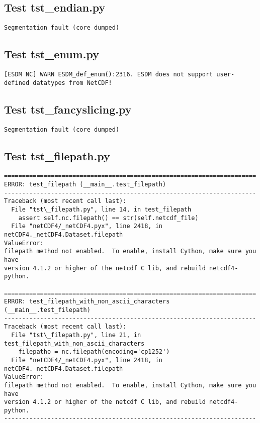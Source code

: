 \subsection{Test tst\_endian.py}

\begin{verbatim}
Segmentation fault (core dumped)
\end{verbatim}

\subsection{Test tst\_enum.py}

\begin{verbatim}
[ESDM NC] WARN ESDM_def_enum():2316. ESDM does not support user-defined datatypes from NetCDF!
\end{verbatim}

\subsection{Test tst\_fancyslicing.py}

\begin{verbatim}
Segmentation fault (core dumped)
\end{verbatim}

\subsection{Test tst\_filepath.py}

\begin{verbatim}
======================================================================
ERROR: test_filepath (__main__.test_filepath)
----------------------------------------------------------------------
Traceback (most recent call last):
  File "tst\_filepath.py", line 14, in test_filepath
    assert self.nc.filepath() == str(self.netcdf_file)
  File "netCDF4/_netCDF4.pyx", line 2418, in netCDF4._netCDF4.Dataset.filepath
ValueError:
filepath method not enabled.  To enable, install Cython, make sure you have
version 4.1.2 or higher of the netcdf C lib, and rebuild netcdf4-python.

======================================================================
ERROR: test_filepath_with_non_ascii_characters (__main__.test_filepath)
----------------------------------------------------------------------
Traceback (most recent call last):
  File "tst\_filepath.py", line 21, in test_filepath_with_non_ascii_characters
    filepatho = nc.filepath(encoding='cp1252')
  File "netCDF4/_netCDF4.pyx", line 2418, in netCDF4._netCDF4.Dataset.filepath
ValueError:
filepath method not enabled.  To enable, install Cython, make sure you have
version 4.1.2 or higher of the netcdf C lib, and rebuild netcdf4-python.
----------------------------------------------------------------------

\end{verbatim}

